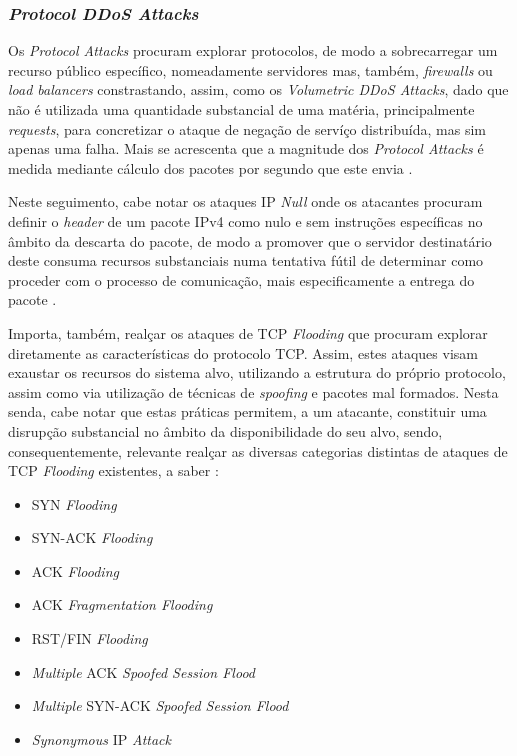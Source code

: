 \subsubsection{\textit{Protocol DDoS Attacks}}
Os \textit{Protocol Attacks} procuram explorar protocolos, de modo a sobrecarregar um recurso público específico, nomeadamente servidores mas, também, \textit{firewalls} ou \textit{load balancers} constrastando, assim, como os \textit{Volumetric DDoS Attacks}, dado que não é utilizada uma quantidade substancial de uma matéria, principalmente \textit{requests}, para concretizar o ataque de negação de servíço distribuída, mas sim apenas uma falha. Mais se acrescenta que a magnitude dos \textit{Protocol Attacks} é medida mediante cálculo dos pacotes por segundo que este envia \cite{esecurityplanet_types_of_ddos_attacks}.


Neste seguimento, cabe notar os ataques IP \textit{Null} onde os atacantes procuram definir o \textit{header} de um pacote IPv4 como nulo e sem instruções específicas no âmbito da descarta do pacote, de modo a promover que o servidor destinatário deste consuma recursos substanciais numa tentativa fútil de determinar como proceder com o processo de comunicação, mais especificamente a entrega do pacote \cite{esecurityplanet_types_of_ddos_attacks}.

Importa, também, realçar os ataques de TCP \textit{Flooding} que procuram explorar diretamente as características do protocolo TCP. Assim, estes ataques visam exaustar os recursos do sistema alvo, utilizando a estrutura do próprio protocolo, assim como via utilização de técnicas de \textit{spoofing} e pacotes mal formados. Nesta senda, cabe notar que estas práticas permitem, a um atacante, constituir uma disrupção substancial no âmbito da disponibilidade do seu alvo, sendo, consequentemente, relevante realçar as diversas categorias distintas de ataques de TCP \textit{Flooding} existentes, a saber \cite{esecurityplanet_types_of_ddos_attacks,connectwise_types_of_ddos_attacks}:
\begin{itemize}
    \item SYN \textit{Flooding}
    \item SYN-ACK \textit{Flooding}
    \item ACK \textit{Flooding}
    \item ACK \textit{Fragmentation Flooding}
    \item RST/FIN \textit{Flooding}
    \item \textit{Multiple} ACK \textit{Spoofed Session Flood}
    \item \textit{Multiple} SYN-ACK \textit{Spoofed Session Flood}
    \item \textit{Synonymous} IP \textit{Attack}
\end{itemize}


